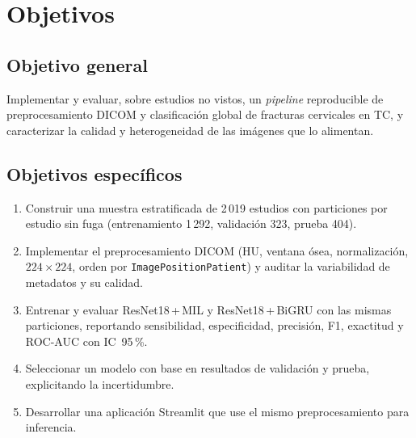 \section{Objetivos}
\subsection{Objetivo general}
Implementar y evaluar, sobre estudios no vistos, un \emph{pipeline} reproducible de preprocesamiento DICOM y clasificaci\'on global de fracturas cervicales en TC, y caracterizar la calidad y heterogeneidad de las im\'agenes que lo alimentan.
\subsection{Objetivos espec\'ificos}
\begin{enumerate}[nosep]
\item Construir una muestra estratificada de 2\,019 estudios con particiones por estudio sin fuga (entrenamiento 1\,292, validaci\'on 323, prueba 404).
\item Implementar el preprocesamiento DICOM (HU, ventana \'osea, normalizaci\'on, $224\times224$, orden por \texttt{ImagePositionPatient}) y auditar la variabilidad de metadatos y su calidad.
\item Entrenar y evaluar ResNet18\,+\,MIL y ResNet18\,+\,BiGRU con las mismas particiones, reportando sensibilidad, especificidad, precisi\'on, F1, exactitud y ROC-AUC con IC~95\,\%.
\item Seleccionar un modelo con base en resultados de validaci\'on y prueba, explicitando la incertidumbre.
\item Desarrollar una aplicaci\'on Streamlit que use el mismo preprocesamiento para inferencia.
\end{enumerate}
